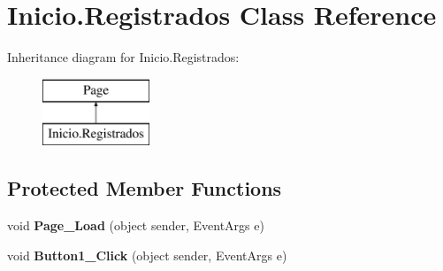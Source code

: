 \hypertarget{class_inicio_1_1_registrados}{}\section{Inicio.\+Registrados Class Reference}
\label{class_inicio_1_1_registrados}
Inheritance diagram for Inicio.\+Registrados\+:\begin{figure}[H]
\begin{center}
\leavevmode
\includegraphics[height=2.000000cm]{class_inicio_1_1_registrados}
\end{center}
\end{figure}
\subsection*{Protected Member Functions}
\begin{DoxyCompactItemize}
\item 
\mbox{\label{class_inicio_1_1_registrados_abcd4568d8c98855d98174d384c597063}} 
void {\bfseries Page\+\_\+\+Load} (object sender, Event\+Args e)
\item 
\mbox{\label{class_inicio_1_1_registrados_a3f8a14965116a309bdfe026bf3d6d743}} 
void {\bfseries Button1\+\_\+\+Click} (object sender, Event\+Args e)
\end{DoxyCompactItemize}

